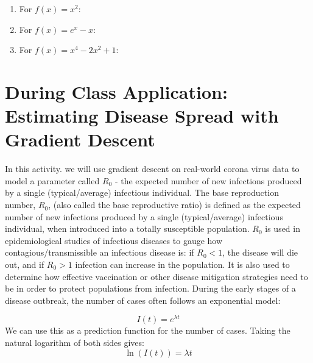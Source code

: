 \documentclass[11pt]{article}
\begin{document}
\begin{enumerate}

    \item For $f(x) = x^2$:

    \item For $f(x) = e^x - x$:

    \item For $f(x) = x^4 - 2x^2 + 1$:

\end{enumerate}

\newpage
\section*{During Class Application: Estimating Disease Spread with Gradient Descent}
In this activity. we will use gradient descent on real-world corona virus data to model a parameter called $R_0$ - the expected number of new infections produced by a single (typical/average) infectious individual.
The base reproduction number, $R_0$, (also called the base reproductive ratio) is defined as the expected number of new infections produced by a single (typical/average) infectious individual, when introduced into a totally susceptible population. $R_0$ is used in epidemiological studies of infectious diseases to gauge how contagious/transmissible an infectious disease is: if $R_0 < 1$, the disease will die out, and if $R_0 > 1$ infection can increase in the population. It is also used to determine how effective vaccination or other disease mitigation strategies need to be in order to protect populations from infection.
During the early stages of a disease outbreak, the number of cases often follows an exponential model:



\[
I(t) = e^{\lambda t}
\]
We can use this as a prediction function for the number of cases.
Taking the natural logarithm of both sides gives:
\[
\ln (I(t)) = \lambda t
\]
\end{document}
